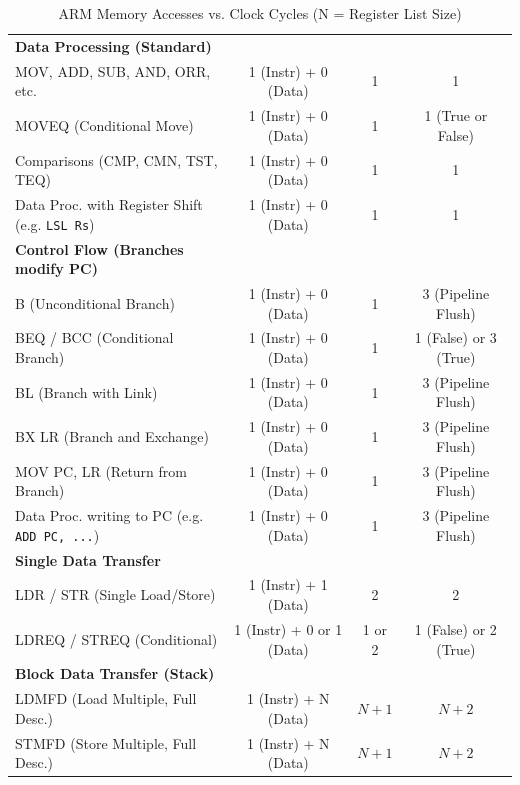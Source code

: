 \documentclass[../comorg-part1.tex]{subfiles}
\begin{document}
\begin{landscape}
\begin{table}[H]
\begin{tabular}{|l|c|c|c|}
\textbf{Data Processing (Standard)} & & & \\
MOV, ADD, SUB, AND, ORR, etc. & 1 (Instr) + 0 (Data) & 1 & 1 \\
MOVEQ (Conditional Move) & 1 (Instr) + 0 (Data) & 1 & 1 (True or False) \\
Comparisons (CMP, CMN, TST, TEQ) & 1 (Instr) + 0 (Data) & 1 & 1 \\
Data Proc. with Register Shift (e.g. \texttt{LSL Rs}) & 1 (Instr) + 0 (Data) & 1 & 1 \\

\textbf{Control Flow (Branches modify PC)} & & & \\
B (Unconditional Branch) & 1 (Instr) + 0 (Data) & 1 & 3 (Pipeline Flush) \\
BEQ / BCC (Conditional Branch) & 1 (Instr) + 0 (Data) & 1 & 1 (False) or 3 (True) \\
BL (Branch with Link) & 1 (Instr) + 0 (Data) & 1 & 3 (Pipeline Flush) \\
BX LR (Branch and Exchange) & 1 (Instr) + 0 (Data) & 1 & 3 (Pipeline Flush) \\
MOV PC, LR (Return from Branch) & 1 (Instr) + 0 (Data) & 1 & 3 (Pipeline Flush) \\
Data Proc. writing to PC (e.g. \texttt{ADD PC, ...}) & 1 (Instr) + 0 (Data) & 1 & 3 (Pipeline Flush) \\

\textbf{Single Data Transfer} & & & \\
LDR / STR (Single Load/Store) & 1 (Instr) + 1 (Data) & 2 & 2 \\
LDREQ / STREQ (Conditional) & 1 (Instr) + 0 or 1 (Data) & 1 or 2 & 1 (False) or 2 (True) \\

\textbf{Block Data Transfer (Stack)} & & & \\
LDMFD (Load Multiple, Full Desc.) & 1 (Instr) + N (Data) & $N+1$ & $N+2$ \\
STMFD (Store Multiple, Full Desc.) & 1 (Instr) + N (Data) & $N+1$ & $N+2$ \\
\hline

\end{tabular}
\caption{ARM Memory Accesses vs. Clock Cycles (N = Register List Size)}
\end{table}

\newpage


\end{landscape}
\end{document}
